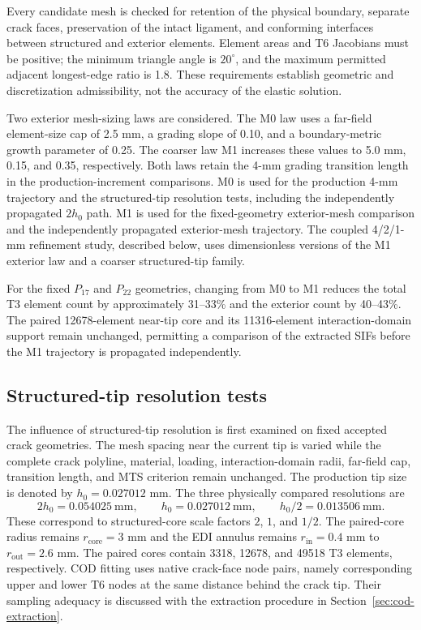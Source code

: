 \documentclass[11pt]{article}
\begin{document}
Every candidate mesh is checked for retention of the physical boundary,
separate crack faces, preservation of the intact ligament, and conforming
interfaces between structured and exterior elements. Element areas and
T6 Jacobians must be positive; the minimum triangle angle is
$20^\circ$, and the maximum permitted adjacent longest-edge ratio is 1.8.
These requirements establish geometric and discretization
admissibility, not the accuracy of the elastic solution.

Two exterior mesh-sizing laws are considered. The M0 law uses a far-field element-size cap of 2.5 mm, a grading
slope of 0.10, and a boundary-metric growth parameter of 0.25.
The coarser law M1 increases these values to 5.0 mm, 0.15, and
0.35, respectively. Both laws retain the 4-mm grading transition
length in the production-increment comparisons. M0 is used for
the production 4-mm trajectory and the structured-tip resolution
tests, including the independently propagated $2h_0$ path.
M1 is used for the fixed-geometry exterior-mesh comparison
and the independently propagated exterior-mesh trajectory.
The coupled 4/2/1-mm refinement study, described below,
uses dimensionless versions of the M1 exterior law and a
coarser structured-tip family.

For the fixed $P_{17}$ and $P_{22}$ geometries, changing
from M0 to M1 reduces the total T3 element count by
approximately 31--33\% and the exterior count by 40--43\%.
The paired 12678-element near-tip core and its 11316-element
interaction-domain support remain unchanged, permitting a
comparison of the extracted SIFs before the M1 trajectory
is propagated independently.

\subsection{Structured-tip resolution tests}
The influence of structured-tip resolution is first examined on fixed
accepted crack geometries. The mesh spacing near the current tip is
varied while the complete crack polyline, material, loading,
interaction-domain radii, far-field cap, transition length, and MTS
criterion remain unchanged.
The production tip size is denoted by $h_0=0.027012$ mm. The three
physically compared resolutions are
\begin{equation}
 2h_0=0.054025\ \mathrm{mm},\qquad
 h_0=0.027012\ \mathrm{mm},\qquad
 h_0/2=0.013506\ \mathrm{mm}.
 \label{eq:tiplevels}
\end{equation}
These correspond to structured-core scale factors $2$, $1$, and $1/2$.
The paired-core radius remains $r_{\mathrm{core}}=3$ mm and the EDI annulus remains
$r_{\mathrm{in}}=0.4$ mm to $r_{\mathrm{out}}=2.6$ mm. The paired cores contain 3318, 12678, and
49518 T3 elements, respectively. COD fitting uses native crack-face
node pairs, namely corresponding upper and lower T6 nodes at the same
distance behind the crack tip. Their sampling adequacy is discussed
with the extraction procedure in Section~\ref{sec:cod-extraction}.
\end{document}
